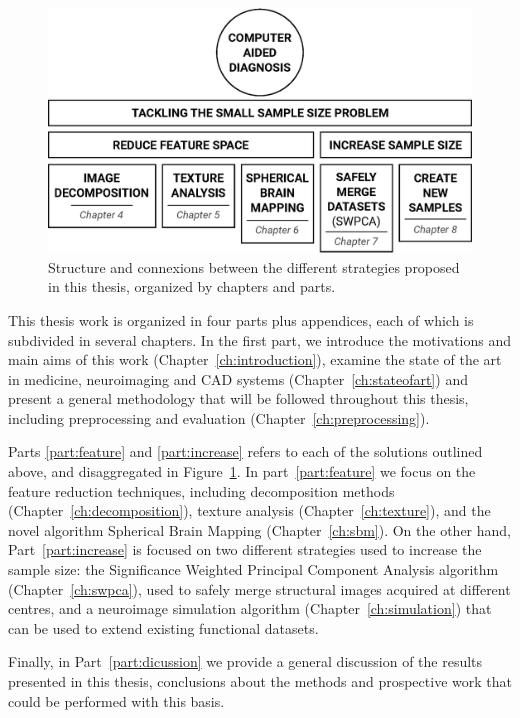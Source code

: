 \begin{figure}
\centering
\includegraphics[width=0.7\linewidth]{Graphics/ch1/outline}
\caption[Structure of the thesis.]{Structure and connexions between the different strategies proposed in this thesis, organized by chapters and parts.}
\label{fig:outline}
\end{figure}

This thesis work is organized in four parts plus appendices, each of which is subdivided in several chapters. In the first part, we introduce the motivations and main aims of this work (Chapter~\ref{ch:introduction}), examine the state of the art in medicine, neuroimaging and \ac{CAD} systems (Chapter~\ref{ch:stateofart}) and present a general methodology that will be followed throughout this thesis, including preprocessing and evaluation (Chapter~\ref{ch:preprocessing}). 

Parts \ref{part:feature} and \ref{part:increase} refers to each of the solutions outlined above, and disaggregated in Figure~\ref{fig:outline}. In part~\ref{part:feature} we focus on the feature reduction techniques, including decomposition methods (Chapter~\ref{ch:decomposition}), texture analysis (Chapter~\ref{ch:texture}), and the novel algorithm Spherical Brain Mapping (Chapter~\ref{ch:sbm}). On the other hand, Part~\ref{part:increase} is focused on two different strategies used to increase the sample size: the Significance Weighted Principal Component Analysis algorithm (Chapter~\ref{ch:swpca}), used to safely merge structural images acquired at different centres, and a neuroimage simulation algorithm (Chapter~\ref{ch:simulation}) that can be used to extend existing functional datasets. 

Finally, in Part~\ref{part:dicussion} we provide a general discussion of the results presented in this thesis, conclusions about the methods and prospective work that could be performed with this basis. 
